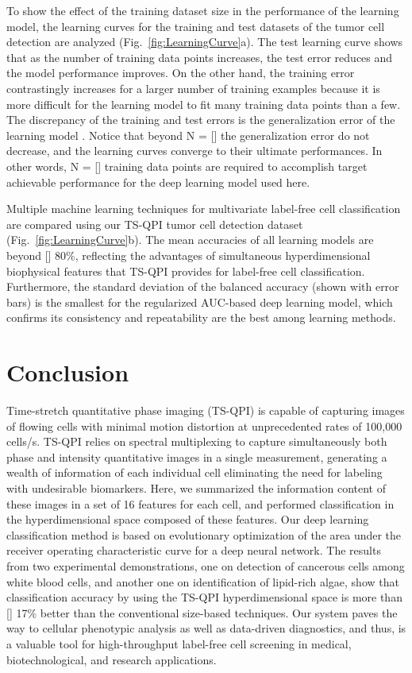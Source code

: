 \documentclass[aps,pra,reprint,longbibliography,superscriptaddress]{revtex4-1}
\begin{document}
To show the effect of the training dataset size in the performance of the learning model, the learning curves for the training and test datasets of the tumor cell detection are analyzed (Fig.~\ref{fig:LearningCurve}a). The test learning curve shows that as the number of training data points increases, the test error reduces and the model performance improves. On the other hand, the training error contrastingly increases for a larger number of training examples because it is more difficult for the learning model to fit many training data points than a few. The discrepancy of the training and test errors is the generalization error of the learning model \cite{abu2012learning}. Notice that beyond N = [] the generalization error do not decrease, and the learning curves converge to their ultimate performances. In other words, N = [] training data points are required to accomplish target achievable performance for the deep learning model used here.

Multiple machine learning techniques for multivariate label-free cell classification are compared using our TS-QPI tumor cell detection dataset (Fig.~\ref{fig:LearningCurve}b). The mean accuracies of all learning models are beyond [] 80\%, reflecting the advantages of simultaneous hyperdimensional biophysical features that TS-QPI provides for label-free cell classification. Furthermore, the standard deviation of the balanced accuracy (shown with error bars) is the smallest for the regularized AUC-based deep learning model, which confirms its consistency and repeatability are the best among learning methods.

\section{Conclusion}

Time-stretch quantitative phase imaging (TS-QPI) is capable of capturing images of flowing cells with minimal motion distortion at unprecedented rates of 100,000 cells/s. TS-QPI relies on spectral multiplexing to capture simultaneously both phase and intensity quantitative images in a single measurement, generating a wealth of information of each individual cell eliminating the need for labeling with undesirable biomarkers. Here, we summarized the information content of these images in a set of 16 features for each cell, and performed classification in the hyperdimensional space composed of these features. Our deep learning classification method is based on evolutionary optimization of the area under the receiver operating characteristic curve for a deep neural network. The results from two experimental demonstrations, one on detection of cancerous cells among white blood cells, and another one on identification of lipid-rich algae, show that classification accuracy by using the TS-QPI hyperdimensional space is more than [] 17\% better than the conventional size-based techniques. Our system paves the way to cellular phenotypic analysis as well as data-driven diagnostics, and thus, is a valuable tool for high-throughput label-free cell screening in medical, biotechnological, and research applications.
\end{document}
